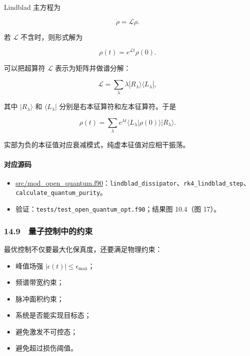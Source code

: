 \documentclass[
]{ctexbook}
\providecommand{\tightlist}{%
  \setlength{\itemsep}{0pt}\setlength{\parskip}{0pt}}
\begin{document}
Lindblad 主方程为

\[
\dot\rho
=
\mathcal L\rho.
\]

若 \(\mathcal L\) 不含时，则形式解为

\[
\rho(t)=e^{\mathcal L t}\rho(0).
\]

可以把超算符 \(\mathcal L\) 表示为矩阵并做谱分解：

\[
\mathcal L
=
\sum_\lambda
\lambda |R_\lambda\rangle\langle L_\lambda|,
\]

其中 \(|R_\lambda\rangle\) 和 \(\langle L_\lambda|\)
分别是右本征算符和左本征算符。于是

\[
\rho(t)
=
\sum_\lambda
e^{\lambda t}
\langle L_\lambda|\rho(0)\rangle
|R_\lambda\rangle.
\]

实部为负的本征值对应衰减模式，纯虚本征值对应相干振荡。

\hypertarget{ux5bf9ux5e94ux6e90ux7801-64}{%
\paragraph{对应源码}\label{ux5bf9ux5e94ux6e90ux7801-64}}

\begin{itemize}
\tightlist
\item
  \href{https://github.com/l1Ha/QuantumGeneralModule/blob/main/src/mod_open_quantum.f90}{src/mod\_open\_quantum.f90}：\texttt{lindblad\_dissipator}、\texttt{rk4\_lindblad\_step}、\texttt{calculate\_quantum\_purity}。
\item
  验证：\texttt{tests/test\_open\_quantum\_opt.f90}；结果图 10.4（图
  17）。
\end{itemize}

\hypertarget{ux91cfux5b50ux63a7ux5236ux4e2dux7684ux7ea6ux675f}{%
\subsubsection{14.9　量子控制中的约束}\label{ux91cfux5b50ux63a7ux5236ux4e2dux7684ux7ea6ux675f}}

最优控制不仅要最大化保真度，还要满足物理约束：

\begin{itemize}
\tightlist
\item
  峰值场强 \(|\epsilon(t)|\le\epsilon_{\max}\)；
\item
  频谱带宽约束；
\item
  脉冲面积约束；
\item
  系统是否能实现目标态；
\item
  避免激发不可控态；
\item
  避免超过损伤阈值。
\end{itemize}
\end{document}
